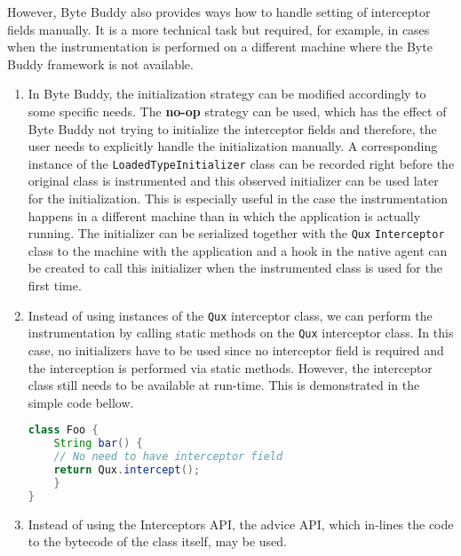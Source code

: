 However, Byte Buddy also provides ways how to handle setting of interceptor fields manually. It is a more technical task but required, for example, in cases when the instrumentation is performed on a different machine where the Byte Buddy framework is not available.
\begin{enumerate}
\item In Byte Buddy, the initialization strategy can be modified accordingly to some specific needs. The \textbf{no-op} strategy can be used, which has the effect of Byte Buddy not trying to initialize the interceptor fields and therefore, the user needs to explicitly handle the initialization manually. A corresponding instance of the \texttt{LoadedTypeInitializer} class can be recorded right before the original class is instrumented and this observed initializer can be used later for the initialization. This is especially useful in the case the instrumentation happens in a different machine than in which the application is actually running. The initializer can be serialized together with the \texttt{Qux} \texttt{Interceptor} class to the machine with the application and a hook in the native agent can be created to call this initializer when the instrumented class is used for the first time.

\item Instead of using instances of the \texttt{Qux} interceptor class, we can perform the instrumentation by calling static methods on the \texttt{Qux} interceptor class. In this case, no initializers have to be used since no interceptor field is required and the interception is performed via static methods. However, the interceptor class still needs to be available at run-time. This is demonstrated in the simple code bellow.

\begin{lstlisting}[language=Java]
class Foo {
	String bar() {
	// No need to have interceptor field
	return Qux.intercept(); 
	}
}
\end{lstlisting}

\item Instead of using the Interceptors API, the advice API, which in-lines the code to the bytecode of the class itself, may be used.
\end{enumerate}


